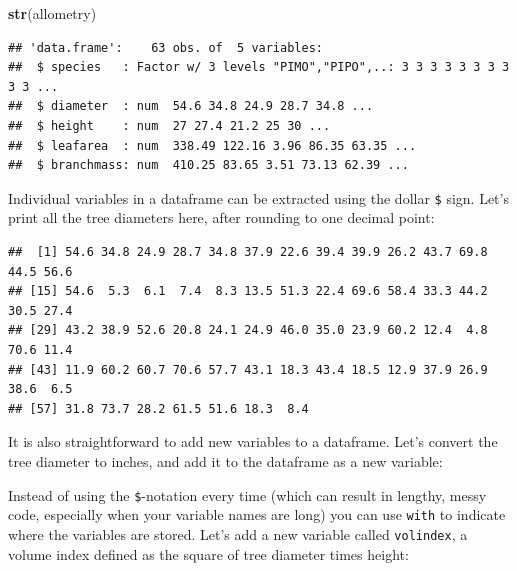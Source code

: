 \documentclass[]{book}
\newenvironment{Shaded}{\begin{snugshade}}{\end{snugshade}}
\newcommand{\DecValTok}[1]{\textcolor[rgb]{0.00,0.00,0.81}{#1}}
\newcommand{\FloatTok}[1]{\textcolor[rgb]{0.00,0.00,0.81}{#1}}
\newcommand{\KeywordTok}[1]{\textcolor[rgb]{0.13,0.29,0.53}{\textbf{#1}}}
\newcommand{\NormalTok}[1]{#1}
\newcommand{\OperatorTok}[1]{\textcolor[rgb]{0.81,0.36,0.00}{\textbf{#1}}}
\newcommand{\StringTok}[1]{\textcolor[rgb]{0.31,0.60,0.02}{#1}}
\begin{document}
\begin{Shaded}
\begin{Highlighting}[]
\KeywordTok{str}\NormalTok{(allometry)}
\end{Highlighting}
\end{Shaded}

\begin{verbatim}
## 'data.frame':    63 obs. of  5 variables:
##  $ species   : Factor w/ 3 levels "PIMO","PIPO",..: 3 3 3 3 3 3 3 3 3 3 ...
##  $ diameter  : num  54.6 34.8 24.9 28.7 34.8 ...
##  $ height    : num  27 27.4 21.2 25 30 ...
##  $ leafarea  : num  338.49 122.16 3.96 86.35 63.35 ...
##  $ branchmass: num  410.25 83.65 3.51 73.13 62.39 ...
\end{verbatim}

Individual variables in a dataframe can be extracted using the dollar \texttt{\$} sign.
Let's print all the tree diameters here, after rounding to one decimal point:

\begin{Shaded}
\end{Shaded}

\begin{verbatim}
##  [1] 54.6 34.8 24.9 28.7 34.8 37.9 22.6 39.4 39.9 26.2 43.7 69.8 44.5 56.6
## [15] 54.6  5.3  6.1  7.4  8.3 13.5 51.3 22.4 69.6 58.4 33.3 44.2 30.5 27.4
## [29] 43.2 38.9 52.6 20.8 24.1 24.9 46.0 35.0 23.9 60.2 12.4  4.8 70.6 11.4
## [43] 11.9 60.2 60.7 70.6 57.7 43.1 18.3 43.4 18.5 12.9 37.9 26.9 38.6  6.5
## [57] 31.8 73.7 28.2 61.5 51.6 18.3  8.4
\end{verbatim}

It is also straightforward to add new variables to a dataframe. Let's convert the tree diameter to inches, and add it to the dataframe as a new variable:

\begin{Shaded}
\end{Shaded}

Instead of using the \texttt{\$}-notation every time (which can result in lengthy, messy code, especially when your variable names are long) you can use \texttt{with} to indicate where the variables are stored. Let's add a new variable called \texttt{volindex}, a volume index defined as the square of tree diameter times height:
\end{document}
